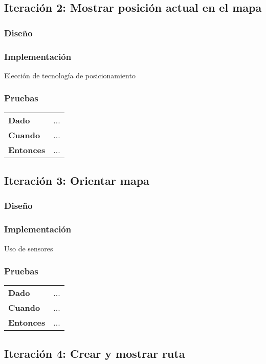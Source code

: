 \subsection{Iteración 2: Mostrar posición actual en el mapa}
\subsubsection{Diseño}
\subsubsection{Implementación}
Elección de tecnología de posicionamiento
\subsubsection{Pruebas}
\begin{tabular}{p{}p{}}
  \hline
  \textbf{Dado}     & ... \\
  \textbf{Cuando}   & ... \\
  \textbf{Entonces} & ... \\
  \hline
\end{tabular}

\subsection{Iteración 3: Orientar mapa}
\subsubsection{Diseño}
\subsubsection{Implementación}
Uso de sensores
\subsubsection{Pruebas}
\begin{tabular}{p{}p{}}
  \hline
  \textbf{Dado}     & ... \\
  \textbf{Cuando}   & ... \\
  \textbf{Entonces} & ... \\
  \hline
\end{tabular}

\subsection{Iteración 4: Crear y mostrar ruta}
